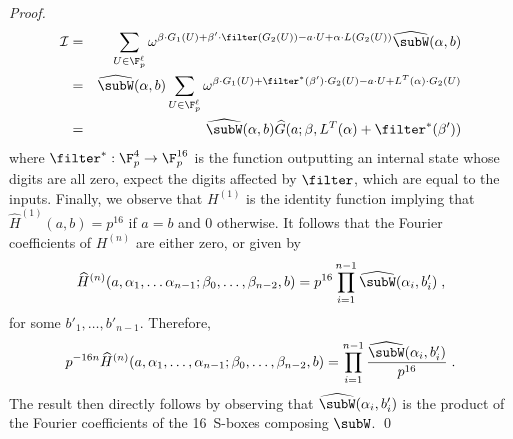 \begin{proof}
\begin{eqnarray*}
   \mathcal{I} & = & \sum_{U \in \F_p^\ell} \omega^{\beta \cdot G_1(U) + \beta' \cdot \filter(G_2(U))- a \cdot U + \alpha \cdot L(G_2(U))} {\widehat \subW}(\alpha, b)\\
   & = & {\widehat \subW}(\alpha, b)\sum_{U \in \F_p^\ell} \omega^{\beta \cdot G_1(U) + \filter^*(\beta') \cdot G_2(U)- a \cdot U + L^T(\alpha) \cdot G_2(U)} \\
   & = & {\widehat \subW}(\alpha, b) {\widehat G}(a ; \beta, L^T(\alpha) + \filter^*(\beta'))
   \end{eqnarray*}
 where \(\filter^*: \F_p^4 \rightarrow \F_p^{16}\) is the function outputting an internal state whose digits are all zero, expect the digits affected by \(\filter\), which are equal to the inputs.
       Finally, we observe that \(H^{(1)}\) is the identity function implying that \({\widehat H^{(1)}}(a,b) = p^{16}\) if \(a=b\) and \(0\) otherwise.
       It follows that the Fourier coefficients of \(H^{(n)}\) are either zero, or given by %
       \[{\widehat H^{(n)}}(a, \alpha_1, \ldots \alpha_{n-1}; \beta_0, \ldots, \beta_{n-2}, b) = p^{16} \prod_{i=1}^{n-1} {\widehat \subW}(\alpha_{i}, b'_i) \;,\]
       for some \(b'_1, \ldots, b'_{n-1}\).
       Therefore,
       \[p^{-16n} {\widehat H^{(n)}}(a, \alpha_1, \ldots, \alpha_{n-1}; \beta_0, \ldots, \beta_{n-2}, b) = \prod_{i=1}^{n-1} \frac{{\widehat \subW}(\alpha_{i}, b'_i)}{p^{16}} \;.\]
   The result then directly follows by observing that \({\widehat \subW}(\alpha_{i}, b'_i)\) is the product of the Fourier coefficients of the 16~\gls{S-box}es composing \(\subW\).
\hfil\qed
  \end{proof}


   
     
